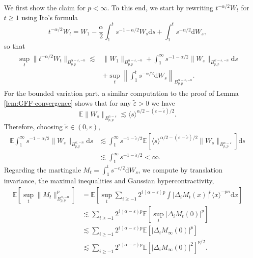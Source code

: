 \documentclass[11pt, a4paper]{scrartcl}
\numberwithin{equation}{section}
\theoremstyle{plain}
\theoremstyle{remark}
\newcommand{\mathd}{\mathrm{d}}
\begin{document}
\label{app:pf-lem-W-Halpha}We first show the claim for $p < \infty$. To this
end, we start by rewriting $t^{- \alpha / 2} W_t$ for $t \geqslant 1$ using
Ito's formula
\[ t^{- \alpha / 2} W_t = W_1 - \frac{\alpha}{2}\int_1^t s^{- 1 - \alpha / 2} W_s \mathd s +
	\int_1^t s^{- \alpha / 2} \mathd W_s, \]
so that
\begin{align}
	\begin{split}
		\sup_t \| t^{- \alpha / 2} W_t \|_{B_{p, p}^{\alpha - \varepsilon, - n}}
		\lesssim & \| W_1 \|_{B_{p, p}^{\alpha - \varepsilon, - n}} + \int_1^{\infty}
		s^{- 1 - \alpha / 2} \| W_s \|_{B_{p, p}^{\alpha - \varepsilon, - n}} \mathd
		s                                                                             \\ &+ \sup_t \left\| \int_1^t s^{- \alpha / 2} \mathd W_s \right\|_{B_{p,
						p}^{\alpha - \varepsilon, - n}} . \label{eq:DDC-W}
	\end{split}
\end{align}
For the bounded variation part, a similar computation to the proof of Lemma
\ref{lem:GFF-convergence} shows that for any $\tilde{\varepsilon} > 0$ we have
\[ \mathbb{E} \| W_s \|_{B^{\alpha - \varepsilon}_{p, p}} \lesssim \langle s
	\rangle^{\alpha / 2 - (\varepsilon - \tilde{\varepsilon}) / 2} . \]
Therefore, choosing $\tilde{\varepsilon} \in (0, \varepsilon)$,
\begin{align*}
	\mathbb{E} \int_1^{\infty} s^{- 1 - \alpha / 2} \| W_s \|_{B_{p,
					p}^{\alpha, - n}} \mathd s
	 & \lesssim \int_1^{\infty} s^{- 1 -
			\tilde{\varepsilon} / 2} \mathbb{E} [\langle s \rangle^{\alpha / 2 -
			(\varepsilon - \tilde{\varepsilon}) / 2} \| W_s \|_{B^{\alpha -
	\varepsilon}_{p, p}}] \mathd s       \\
	 & \lesssim \int_1^{\infty} s^{- 1 -
			\tilde{\varepsilon} / 2} < \infty .
\end{align*}
Regarding the martingale $M_t = \int_1^t s^{- \varepsilon / 2} \mathd W_s$, we
compute by translation invariance, the maximal inequalities and Gaussian
hypercontractivity,
\[ \begin{aligned}
		\mathbb{E} [\sup_t \| M_t \|^p_{B^{\alpha, - n}_{p, p}}] & = \mathbb{E}
		\left[ \sup_t \sum_{i \geqslant - 1} 2^{i (\alpha - \varepsilon) p}  \int
		| \Delta_i M_t (x) |^p \langle x \rangle^{- pn} \mathd x \right]                                                           \\
		                                                         & \lesssim  \sum_{i \geqslant - 1} 2^{i (\alpha - \varepsilon) p}
		\mathbb{E} [\sup_t  | \Delta_i M_t (0) |^p]                                                                                \\
		                                                         & \lesssim  \sum_{i \geqslant - 1} 2^{i (\alpha - \varepsilon) p}
		\mathbb{E} [| \Delta_i M_{\infty} (0) |^p]                                                                                 \\
		                                                         & \lesssim  \sum_{i \geqslant - 1} 2^{i (\alpha - \varepsilon) p}
		\mathbb{E} [| \Delta_i M_{\infty} (0) |^2]^{p / 2} .
	\end{aligned} \]
\end{document}
